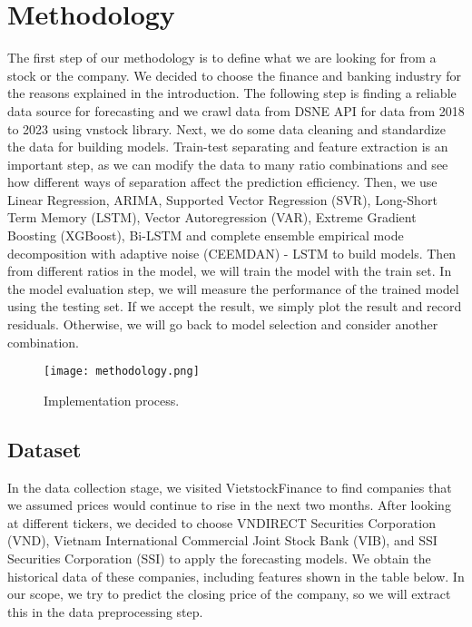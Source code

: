 \documentclass{ieeeojies}
\begin{document}
\section{Methodology}
The first step of our methodology is to define what we are looking for from a stock or the company. We decided to choose the finance and banking industry for the reasons explained in the introduction. The following step is finding a reliable data source for forecasting and we crawl data from DSNE API for data from 2018 to 2023 using vnstock library.  Next, we do some data cleaning and standardize the data for building models. Train-test separating and feature extraction is an important step, as we can modify the data to many ratio combinations and see how different ways of separation affect the prediction efficiency.  Then, we use Linear Regression, ARIMA, Supported Vector Regression (SVR), Long-Short Term Memory (LSTM), Vector Autoregression (VAR), Extreme Gradient Boosting (XGBoost), Bi-LSTM and complete ensemble empirical mode decomposition with adaptive noise (CEEMDAN) - LSTM to build models. Then from different ratios in the model, we will train the model with the train set. In the model evaluation step, we will measure the performance of the trained model using the testing set. If we accept the result, we simply plot the result and record residuals. Otherwise, we will go back to model selection and consider another combination.
\begin{figure}[h]
	\centering
	\texttt{[image: methodology.png]}
	\caption{Implementation process.\centering}
	\label{fig1}
\end{figure}

\subsection{Dataset}
In the data collection stage, we visited VietstockFinance to find companies that we assumed prices would continue to rise in the next two months. After looking at different tickers, we decided to choose VNDIRECT Securities Corporation (VND), Vietnam International Commercial Joint Stock Bank (VIB), and SSI Securities Corporation (SSI) to apply the forecasting models. We obtain the historical data of these companies, including features shown in the table below. In our scope, we try to predict the closing price of the company, so we will extract this in the data preprocessing step.
\end{document}
